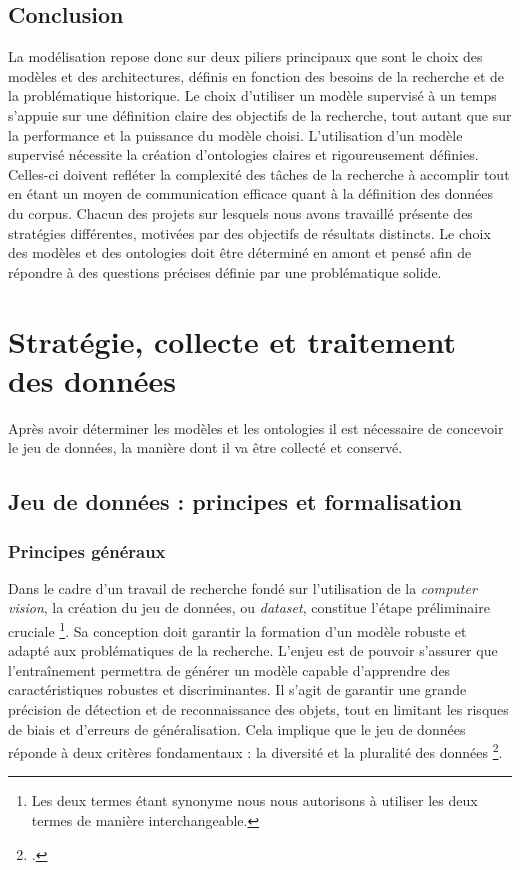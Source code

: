 \documentclass[12pt,twoside]{book}
\begin{document}
\newpage
\section*{Conclusion}
La modélisation repose donc sur deux piliers principaux que sont le choix des modèles et des architectures, définis en fonction des besoins de la recherche et de la problématique historique. Le choix d’utiliser un modèle supervisé à un temps s’appuie sur une définition claire des objectifs de la recherche, tout autant que sur la performance et la puissance du modèle choisi. L’utilisation d’un modèle supervisé nécessite la création d’ontologies claires et rigoureusement définies. Celles-ci doivent refléter la complexité des tâches de la recherche à accomplir tout en étant un moyen de communication efficace quant à la définition des données du corpus. Chacun des projets sur lesquels nous avons travaillé présente des stratégies différentes, motivées par des objectifs de résultats distincts. Le choix des modèles et des ontologies doit être déterminé en amont et pensé afin de répondre à des questions précises définie par une problématique solide.


\chapter{Stratégie, collecte et traitement des données}
Après avoir déterminer les modèles et les ontologies il est nécessaire de concevoir le jeu de données, la manière dont il va être collecté et conservé.

\section[Jeu de données]{Jeu de données : principes et formalisation}
\subsection{Principes généraux }
Dans le cadre d’un travail de recherche fondé sur l’utilisation de la \textit{computer vision}, la création du jeu de données, ou \textit{dataset}, constitue l’étape préliminaire cruciale \footnote{Les deux termes étant synonyme nous nous autorisons à utiliser les deux termes de manière interchangeable.}. Sa conception doit garantir la formation d’un modèle robuste et adapté aux problématiques de la recherche. L’enjeu est de pouvoir s’assurer que l’entraînement permettra de générer un modèle capable d’apprendre des caractéristiques robustes et discriminantes. Il s’agit de garantir une grande précision de détection et de reconnaissance des objets, tout en limitant les risques de biais et d'erreurs de généralisation. Cela implique que le jeu de données réponde à deux critères fondamentaux : la diversité et la pluralité des données \footcite{hutchison_dataset_2006}.
\end{document}
